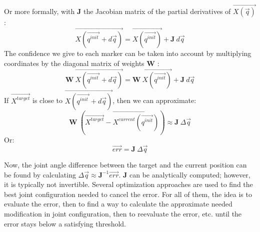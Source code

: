 Or more formally, with \textbf{J} the Jacobian matrix of the partial derivatives of $\overrightarrow{X(\overrightarrow{q})}$ :
\begin{equation}
      \overrightarrow{X(\overrightarrow{q^{init ^{\ }}}+d\overrightarrow{q})}= \overrightarrow{X(\overrightarrow{q^{init}})} + \textbf{J} \ d\overrightarrow{q}
\end{equation} 
The confidence we give to each marker can be taken into account by multiplying coordinates by the diagonal matrix of weights \textbf{W} \cite{Meredith2005}:
\begin{equation}
  \textbf{W} \ \overrightarrow{X(\overrightarrow{q^{init ^{\ }}}+d\overrightarrow{q})}= \textbf{W} \ \overrightarrow{X(\overrightarrow{q^{init}})} + \textbf{J} \ d\overrightarrow{q}
\end{equation} 
If $\overrightarrow{X^{target}}$ is close to $\overrightarrow{X(\overrightarrow{q^{init ^{\ }}}+d\overrightarrow{q})}$, then we can approximate:
\begin{equation}
  \textbf{W} \ (\overrightarrow{X^{target}} - \overrightarrow{X^{current}(\overrightarrow{q^{init}})}) \approx \textbf{J} \ \Delta \overrightarrow{q}
\end{equation} 
Or:
\begin{equation}\label{eq:jac}
  \boxed{
    \overrightarrow{err} = \textbf{J} \ \Delta \overrightarrow{q}}
\end{equation} 

Now, the joint angle difference between the target and the current position can be found by calculating $\Delta \overrightarrow{q} \approx \textbf{J}^{-1} \overrightarrow{err}$. \textbf{J} can be analytically computed; however, it is typically not invertible. Several optimization approaches are used to find the best joint configuration needed to cancel the error. For all of them, the idea is to evaluate the error, then to find a way to calculate the approximate needed modification in joint configuration, then to reevaluate the error, etc. until the error stays below a satisfying threshold.

